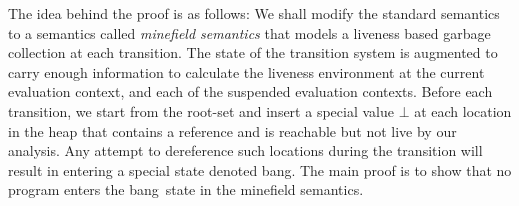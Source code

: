 \documentclass[9pt]{sigplanconf}
\newcommand{\bang}{\mbox{\sc bang}}
\begin{document}
The idea behind the proof is  as follows: We shall modify the standard
semantics to a semantics  called {\em minefield semantics} that models
a liveness based garbage collection  at each transition.  The state of
the  transition system  is augmented  to carry  enough  information to
calculate the liveness environment  at the current evaluation context,
and  each   of  the   suspended  evaluation  contexts.    Before  each
transition,  we start  from the  root-set and  insert a  special value
$\bot$ at each  location in the heap that contains  a reference and is
reachable but  not live by  our analysis.  Any attempt  to dereference
such locations during the transition will result in entering a special
state denoted \bang.  The main proof is to show that no program enters
the \bang\ state in the minefield semantics.
 
\end{document}
